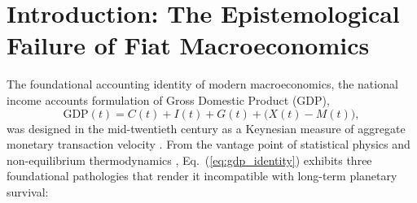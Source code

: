 \documentclass[aps,pre,twocolumn,10pt,superscriptaddress,amsmath,amssymb,amsfonts,floatfix,showkeys]{revtex4-2}
\begin{document}

\maketitle

\section{Introduction: The Epistemological Failure of Fiat Macroeconomics}

The foundational accounting identity of modern macroeconomics, the national income accounts formulation of Gross Domestic Product (GDP),
\begin{equation}
    \text{GDP}(t) = C(t) + I(t) + G(t) + \big(X(t) - M(t)\big),
    \label{eq:gdp_identity}
\end{equation}
was designed in the mid-twentieth century as a Keynesian measure of aggregate monetary transaction velocity \cite{GeorgescuRoegen1971, Daly1996}. From the vantage point of statistical physics and non-equilibrium thermodynamics \cite{Prigogine1977, Jaynes1957}, Eq.~(\ref{eq:gdp_identity}) exhibits three foundational pathologies that render it incompatible with long-term planetary survival:
\end{document}
